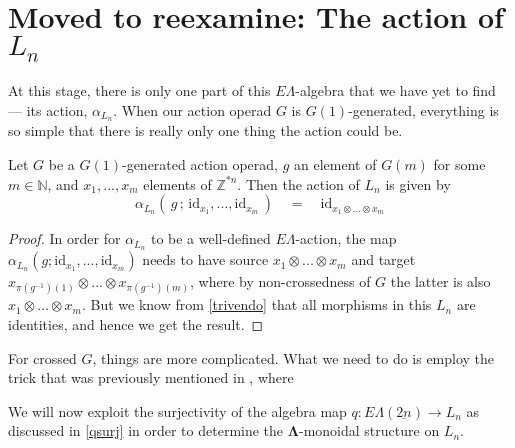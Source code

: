 \documentclass{amsbook} %
\newcommand{\ML}{\mathbf{\Lambda}}
\newcommand{\ELnn}{E\Lambda(\underline{2n})}
\numberwithin{section}{chapter}
\begin{document}
\section{Moved to reexamine: The action of \texorpdfstring{$L_n$}{L_n}}



At this stage, there is only one part of this $E\Lambda$-algebra that we have yet to find --- its action, $\alpha_{L_n}$. When our action operad $G$ is $G(1)$-generated, everything is so simple that there is really only one thing the action could be.

\begin{lem} \label{G1act} Let $G$ be a $G(1)$-generated action operad, $g$ an element of $G(m)$ for some $m \in \mathbb{N}$, and $x_1, ..., x_m$ elements of $\mathbb{Z}^{\ast n}$. Then the action of $L_n$ is given by
\[ \alpha_{L_n}( \, g \, ; \, \mathrm{id}_{x_1}, ..., \mathrm{id}_{x_m} \, ) \quad = \quad \mathrm{id}_{x_1 \otimes ... \otimes x_m} \]
\end{lem}
\begin{proof}
In order for $\alpha_{L_n}$ to be a well-defined $E\Lambda$-action, the map $\alpha_{L_n}(g; \mathrm{id}_{x_1}, ..., \mathrm{id}_{x_m})$ needs to have source $x_1 \otimes ... \otimes x_m$ and target $x_{\pi(g^{-1})(1)} \otimes ... \otimes x_{\pi(g^{-1})(m)}$, where by non-crossedness of $G$ the latter is also $x_1 \otimes ... \otimes x_m$. But we know from \cref{trivendo} that all morphisms in this $L_n$ are identities, and hence we get the result.
\end{proof}

For crossed $G$, things are more complicated. What we need to do is employ the trick that was previously mentioned in , where 





We will now exploit the surjectivity of the algebra map $q: \ELnn \to L_n$ as discussed in \cref{qsurj} in order to determine the $\ML$-monoidal structure on $L_n$.

\end{document}
